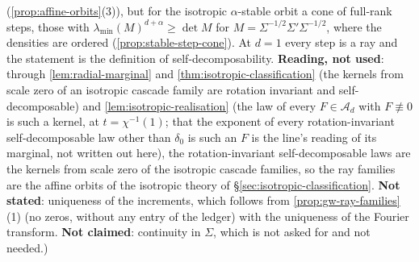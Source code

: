 \begin{proposition}
{(\ref{prop:affine-orbits}(3)), but for the isotropic $\alpha$-stable orbit a cone of full-rank
steps, those with $\lambda_{\min}(M)^{d+\alpha} \ge \det M$ for $M = \Sigma^{-1/2}\Sigma'\Sigma^{-1/2}$,
where the \Levy{} densities are ordered (\ref{prop:stable-step-cone}). At $d = 1$ every step is a ray
and the statement is the definition of self-decomposability. \textbf{Reading, not used}: through
\ref{lem:radial-marginal} and \ref{thm:isotropic-classification} (the kernels from scale zero of an
isotropic cascade family are rotation invariant and self-decomposable) and
\ref{lem:isotropic-realisation} (the law of every $F \in \mathcal{A}_d$ with $F \not\equiv 0$ is
such a kernel, at $t = \chi^{-1}(1)$; that the exponent of every rotation-invariant
self-decomposable law other than $\delta_0$ is such an $F$ is the line's reading of its marginal,
not written out here), the rotation-invariant self-decomposable laws are the kernels from scale zero of the isotropic cascade families, so the
ray families are the affine orbits of the isotropic theory of \S\ref{sec:isotropic-classification}.
\textbf{Not stated}: uniqueness of the increments, which follows from
\ref{prop:gw-ray-families}(1) (no zeros, without any entry of the ledger) with the uniqueness of the
Fourier transform. \textbf{Not claimed}:
continuity in $\Sigma$, which is not asked for and not needed.)}
\end{proposition}

